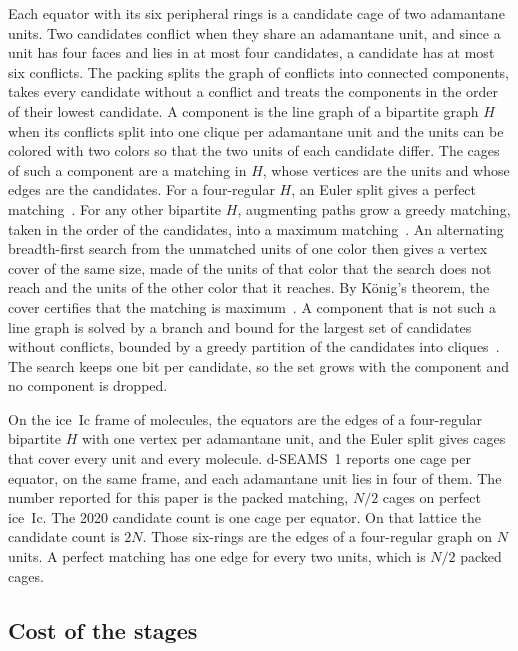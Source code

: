 \documentclass[preprint,12pt]{elsarticle}
\begin{document}
Each equator with its six peripheral rings is a candidate cage of two adamantane units.
Two candidates conflict when they share an adamantane unit, and since a unit has four faces and lies in at most four candidates, a candidate has at most six conflicts.
The packing splits the graph of conflicts into connected components, takes every candidate without a conflict and treats the components in the order of their lowest candidate.
A component is the line graph of a bipartite graph $H$ when its conflicts split into one clique per adamantane unit and the units can be colored with two colors so that the two units of each candidate differ.
The cages of such a component are a matching in $H$, whose vertices are the units and whose edges are the candidates.
For a four-regular $H$, an Euler split gives a perfect matching~\cite{gabow1976euler}.
For any other bipartite $H$, augmenting paths grow a greedy matching, taken in the order of the candidates, into a maximum matching~\cite{kuhn1955hungarian}.
An alternating breadth-first search from the unmatched units of one color then gives a vertex cover of the same size, made of the units of that color that the search does not reach and the units of the other color that it reaches.
By K\"onig's theorem, the cover certifies that the matching is maximum~\cite{konig1931graphs}.
A component that is not such a line graph is solved by a branch and bound for the largest set of candidates without conflicts, bounded by a greedy partition of the candidates into cliques~\cite{tomita2003maxclique}.
The search keeps one bit per candidate, so the set grows with the component and no component is dropped.

On the ice~Ic frame of  molecules, the  equators are the edges of a four-regular bipartite $H$ with one vertex per adamantane unit, and the Euler split gives  cages that cover every unit and every molecule.
d-SEAMS~1 reports one cage per equator,  on the same frame, and each adamantane unit lies in four of them.
The number reported for this paper is the packed matching, $N/2$ cages on perfect ice~Ic.
The 2020 candidate count is one cage per equator.
On that lattice the candidate count is $2N$.
Those six-rings are the edges of a four-regular graph on $N$ units.
A perfect matching has one edge for every two units, which is $N/2$ packed cages.

\subsection{Cost of the stages}
\label{sec:s-cost}
\end{document}
